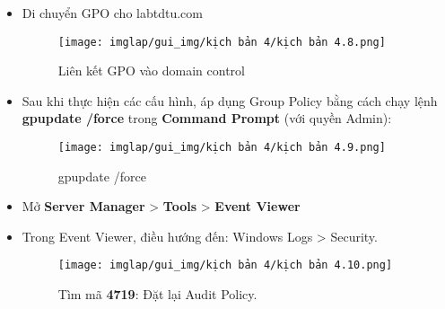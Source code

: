 \documentclass[13pt]{article}
\begin{document}
\begin{enumerate}
\begin{itemize}
\begin{itemize}
                \item Di chuyển GPO cho labtdtu.com 
\begin{figure}[H]
                    \centering
                    \texttt{[image: imglap/gui\_img/kịch bản 4/kịch bản 4.8.png]}
                    \caption{Liên kết GPO vào domain control}
                    \label{fig:enter-label}
                \end{figure}
                                \item Sau khi thực hiện các cấu hình, áp dụng Group Policy bằng cách chạy lệnh \textbf{gpupdate /force} trong \textbf{Command Prompt} (với quyền Admin): 
\begin{figure}[H]
                                    \centering
                                    \texttt{[image: imglap/gui\_img/kịch bản 4/kịch bản 4.9.png]}
                                    \caption{gpupdate /force}
                                    \label{fig:enter-label}
                                \end{figure}
\newpage
                                \item Mở \textbf{Server Manager} > \textbf{Tools} > \textbf{Event Viewer}
                                \item Trong Event Viewer, điều hướng đến: Windows Logs > Security.
\begin{figure}[H]
                                                                    \centering
                                                                    \texttt{[image: imglap/gui\_img/kịch bản 4/kịch bản 4.10.png]}
                                                                    \caption{Tìm mã\textbf{ 4719}: Đặt lại Audit Policy. }
                                                                    \label{fig:enter-label}
                                                                \end{figure}
                                                                                                                                \end{itemize}
                \end{itemize}
        \end{enumerate}
\newpage        
\end{document}

